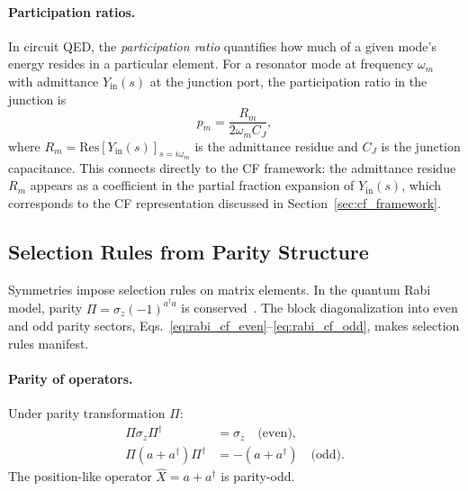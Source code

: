 \documentclass[reprint, floatfix, superscriptaddress, amsmath, amssymb, longbibliography]{revtex4-2}
\begin{document}
\paragraph{Participation ratios.} In circuit QED, the \textit{participation ratio} quantifies how much of a given mode's energy resides in a particular element. For a resonator mode at frequency $\omega_m$ with admittance $Y_{\mathrm{in}}(s)$ at the junction port, the participation ratio in the junction is
\begin{equation}
p_m = \frac{R_m}{2\omega_m C_J},
\label{eq:participation}
\end{equation}
where $R_m = \mathrm{Res}[Y_{\mathrm{in}}(s)]_{s=i\omega_m}$ is the admittance residue and $C_J$ is the junction capacitance. This connects directly to the CF framework: the admittance residue $R_m$ appears as a coefficient in the partial fraction expansion of $Y_{\mathrm{in}}(s)$, which corresponds to the CF representation discussed in Section~\ref{sec:cf_framework}.

\subsection{Selection Rules from Parity Structure}
\label{sec:selection_rules}

Symmetries impose selection rules on matrix elements. In the quantum Rabi model, parity $\Pi = \sigma_z(-1)^{a^\dagger a}$ is conserved~\cite{Braak2011}. The block diagonalization into even and odd parity sectors, Eqs.~\eqref{eq:rabi_cf_even}--\eqref{eq:rabi_cf_odd}, makes selection rules manifest.

\paragraph{Parity of operators.} Under parity transformation $\Pi$:
\begin{align}
\Pi \sigma_z \Pi^\dagger &= \sigma_z \quad \text{(even)}, \label{eq:sigma_z_parity} \\
\Pi (a + a^\dagger) \Pi^\dagger &= -(a + a^\dagger) \quad \text{(odd)}. \label{eq:X_parity}
\end{align}
The position-like operator $\hat{X} = a + a^\dagger$ is parity-odd.
\end{document}
